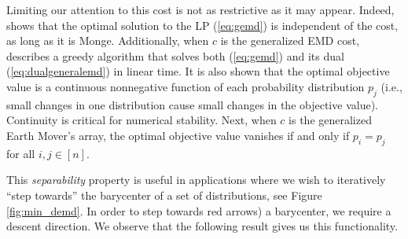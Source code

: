 

\begin{remark}Limiting our attention to this cost is not as restrictive as it may appear. 
Indeed, \cite{BEIN199597} shows that the optimal solution to the LP (\ref{eq:gemd}) is independent of the cost, as long as it is Monge.
Additionally, when $c$ is the generalized EMD cost, \cite{kline2019properties} describes a greedy algorithm that solves both (\ref{eq:gemd}) and its dual (\ref{eq:dualgeneralemd}) in linear time. 
It is also shown that the optimal objective value is a continuous nonnegative function of each probability distribution $p_j$ (i.e., small changes in one distribution cause small changes in the objective value). Continuity is critical for numerical stability.  Next, when $c$ is the generalized Earth Mover's array, the optimal objective value vanishes if and only if $p_i=p_j$ for all $i,j\in[n]$. 
\end{remark}
This {\em separability} property is useful in applications where we wish to iteratively ``step towards'' the barycenter of a set of distributions, see Figure \ref{fig:min_demd}.
In order to step towards {red arrows)} a barycenter, we  require a descent direction.  %
We observe that the following  result gives us  this functionality.

